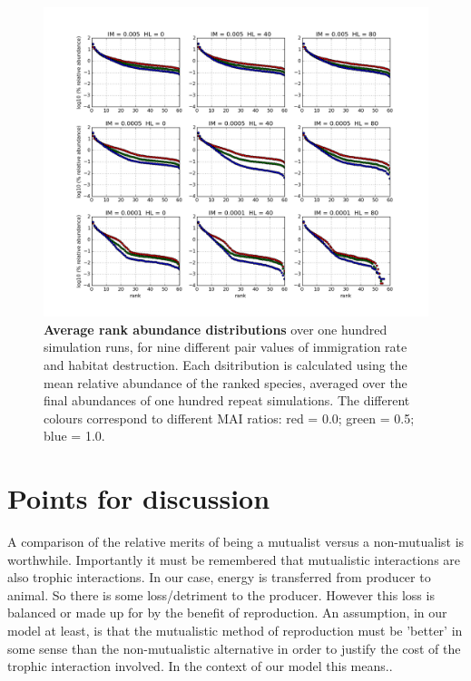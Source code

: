 \begin{itemize}
{\begin{figure}
        \includegraphics[width=\linewidth]{"./chapters/chapter04/figures/mean_rads"}
        \caption{\textbf{Average rank abundance distributions} over one hundred simulation runs, for nine different pair values of immigration rate and habitat destruction. Each dsitribution is calculated using the mean relative abundance of the ranked species, averaged over the final abundances of one hundred repeat simulations. The different colours correspond to different MAI ratios: red = 0.0; green = 0.5; blue = 1.0.}
        \label{fig:mean_rads}
\end{figure}
}


\section{Points for discussion}

A comparison of the relative merits of being a mutualist versus a non-mutualist is worthwhile. Importantly it must be remembered that mutualistic interactions are also trophic interactions. In our case, energy is transferred from producer to animal. So there is some loss/detriment to the producer. However this loss is balanced or made up for by the benefit of reproduction. An assumption, in our model at least, is that the mutualistic method of reproduction must be 'better' in some sense than the non-mutualistic alternative in order to justify the cost of the trophic interaction involved. In the context of our model this means..


\end{itemize}
